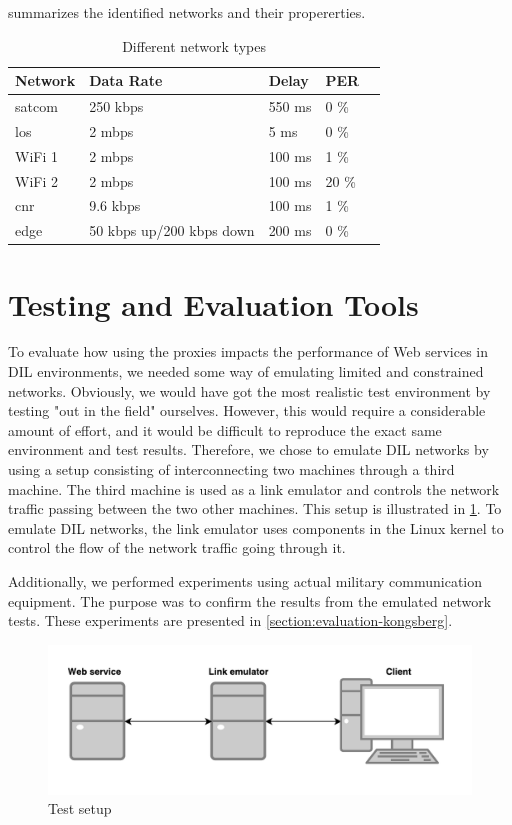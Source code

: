  summarizes the identified networks and their
propererties.

\begin{table}[h]
\begin{tabular}{| l | l | l | l | l |}
\hline
  \textbf{Network} & \textbf{Data Rate} & \textbf{Delay} & \textbf{PER} \\ \hline
  \gls{satcom} & 250 kbps & 550 ms & 0 \% \\ \hline
  \gls{los} & 2 mbps & 5 ms & 0 \% \\ \hline
  WiFi 1 & 2 mbps & 100 ms & 1 \% \\ \hline
  WiFi 2 & 2 mbps & 100 ms & 20 \% \\ \hline
  \gls{cnr} & 9.6 kbps & 100 ms & 1 \% \\ \hline
  \gls{edge} & 50 kbps up/200 kbps down & 200 ms & 0 \% \\ \hline
\end{tabular}
\caption{Different network types}
\label{table-network-types}
\end{table}


\section{Testing and Evaluation Tools}

To evaluate how using the proxies impacts the performance of Web services in DIL
environments, we needed some way of emulating limited and constrained networks.
Obviously, we would have got the most realistic test environment by testing "out
in the field" ourselves. However, this would require a considerable amount of
effort, and it would be difficult to reproduce the exact same environment and
test results. Therefore, we chose to emulate DIL networks by using a setup
consisting of interconnecting two machines through a third machine. The third
machine is used as a link emulator and controls the network traffic passing
between the two other machines. This setup is illustrated in
\cref{figure-testing-environment-simple}. To emulate DIL networks, the link
emulator uses components in the Linux kernel to control the flow of the network
traffic going through it.

Additionally, we performed experiments using actual military communication
equipment. The purpose was to confirm the results from the emulated network
tests. These experiments are presented in \cref{section:evaluation-kongsberg}.

\begin{figure}[h]
\includegraphics[width=\textwidth]{images/testing_environment_simple.png}
\caption{Test setup}
\label{figure-testing-environment-simple}
\end{figure}

